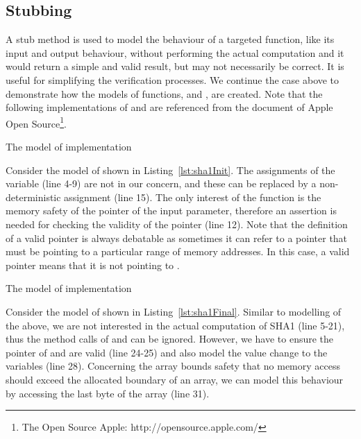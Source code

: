 \subsection{Stubbing} \label{subsec:stubbing}
A stub method is used to model the behaviour of a targeted function, like its input and output behaviour, without performing the actual computation and it would return a simple and valid result, but may not necessarily be correct. It is useful for simplifying the verification processes. We continue the case above to demonstrate how the models of functions,  and , are created. Note that the following implementations of  and  are referenced from the document of Apple Open Source\footnote{The Open Source Apple: http://opensource.apple.com/}.

\begin{listing}[hpt]
\caption{The model of  implementation}
\label{lst:sha1Init}
\end{listing}

Consider the model of  shown in Listing~\ref{lst:sha1Init}. The assignments of the variable  (line 4-9) are not in our concern, and these can be replaced by a non-deterministic assignment (line 15). The only interest of the function is the memory safety of the pointer of the input parameter, therefore an assertion is needed for checking the validity of the pointer (line 12). Note that the definition of a valid pointer is always debatable as sometimes it can refer to a pointer that must be pointing to a particular range of memory addresses. In this case, a valid pointer means that it is not pointing to . 

\begin{listing}[hpt]
\caption{The model of  implementation}
\label{lst:sha1Final}
\end{listing}

Consider the model of  shown in Listing~\ref{lst:sha1Final}. Similar to modelling of the  above, we are not interested in the actual computation of SHA1 (line 5-21), thus the method calls of  and  can be ignored. However, we have to ensure the pointer of  and  are valid (line 24-25) and also model the value change to the variables (line 28). Concerning the array bounds safety that no memory access should exceed the allocated boundary of an array, we can model this behaviour by accessing the last byte of the array (line 31).


